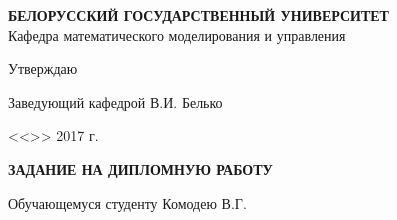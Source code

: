 \thispagestyle{empty}

\begin{center}
    \normalsize {\bf БЕЛОРУССКИЙ ГОСУДАРСТВЕННЫЙ УНИВЕРСИТЕТ}\\
    Кафедра математического моделирования и управления\\
\end{center}

\vspace{0.7cm}

Утверждаю


Заведующий кафедрой \underline{\hspace{3cm}} В.И. Белько

<<\underline{\hspace{1cm}}>> \underline{\hspace{3.3cm}} 2017 г.
\begin{center}
    \bf ЗАДАНИЕ НА ДИПЛОМНУЮ РАБОТУ
\end{center}

Обучающемуся студенту Комодею В.Г.


